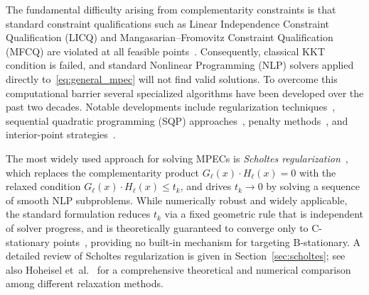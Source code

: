 The fundamental difficulty arising from complementarity constraints is
that standard constraint qualifications such as Linear Independence Constraint
Qualification (LICQ) and Mangasarian--Fromovitz Constraint Qualification
(MFCQ) are violated at all feasible points~\citep{ScheelScholtes2000}.
Consequently, classical KKT condition is failed, and
standard Nonlinear Programming (NLP) solvers applied directly
to~\eqref{eq:general_mpec} will not find valid solutions. 
To overcome this computational barrier several specialized algorithms have been developed over the past two decades. Notable developments include regularization
techniques~\cite{Scholtes2001,LinFukushima2005,Kadrani2009,SteffensenUlbrich2010}, sequential quadratic programming (SQP)
approaches~\cite{FletcherLeyffer2004,FletcherLeyfferRalphScholtes2006}, penalty
methods~\cite{HuRalph2004,Anitescu2005}, and interior-point
strategies~\cite{RaghunnathanBiegler2005,LeyfferLopezCalvaNocedal2006}.


The most widely used approach for solving MPECs is \emph{Scholtes
regularization}~\cite{Scholtes2001}, which replaces the
complementarity product $G_\ell(x) \cdot H_\ell(x) = 0$ with the
relaxed condition $G_\ell(x) \cdot H_\ell(x) \leq t_k$, and drives
$t_k \to 0$ by solving a sequence of smooth NLP subproblems. While
numerically robust and widely applicable, the standard formulation
reduces $t_k$ via a fixed geometric rule that is independent of solver
progress, and is theoretically guaranteed to converge only to
C-stationary points~\cite{Scholtes2001,HoheiselKanzowSchwartz2013},
providing no built-in mechanism for targeting B-stationary. A detailed review of Scholtes regularization is given
in Section~\ref{sec:scholtes}; see also Hoheisel
et~al.~\cite{HoheiselKanzowSchwartz2013} for a comprehensive
theoretical and numerical comparison among different relaxation methods.

